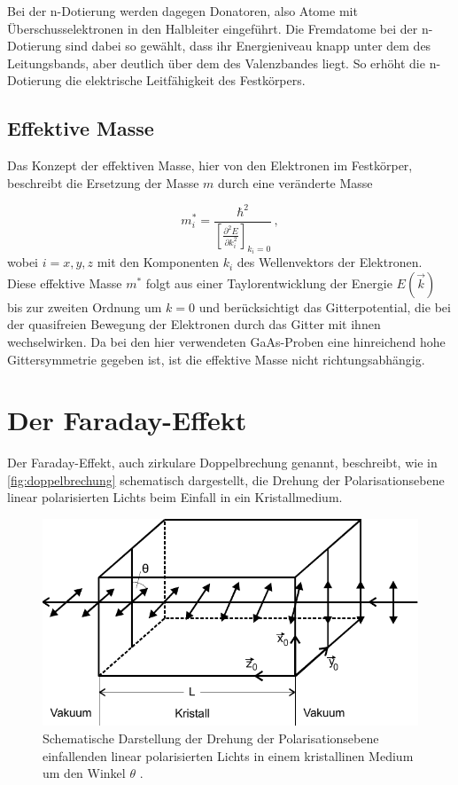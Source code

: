 Bei der n-Dotierung werden dagegen Donatoren, also Atome mit Überschusselektronen in den Halbleiter eingeführt.
Die Fremdatome bei der  n-Dotierung sind dabei so gewählt, dass ihr Energieniveau knapp unter dem des Leitungsbands,
aber deutlich über dem des Valenzbandes liegt.
So erhöht die n-Dotierung die elektrische Leitfähigkeit des Festkörpers.


\subsection{Effektive Masse}

Das Konzept der effektiven Masse, hier von den Elektronen im Festkörper, beschreibt die Ersetzung der Masse $m$ durch eine veränderte Masse

\begin{equation}
    m^*_i = \frac{\hbar^2}{\left[\frac{\partial^2 E}{\partial k^2_i} \right]_{k_i=0}} \,,
    \label{eq:effektivemasse}
\end{equation}
wobei $i = x,y,z$ mit den Komponenten $k_i$ des Wellenvektors der Elektronen.
Diese effektive Masse $m^*$ folgt aus einer Taylorentwicklung der Energie $E(\vec{k})$ bis zur zweiten Ordnung um $k=0$ und berücksichtigt das Gitterpotential,
die bei der quasifreien Bewegung der Elektronen durch das Gitter mit ihnen wechselwirken.
Da bei den hier verwendeten GaAs-Proben eine hinreichend hohe Gittersymmetrie gegeben ist, ist die effektive Masse nicht richtungsabhängig.


\section{Der Faraday-Effekt}

Der Faraday-Effekt, auch zirkulare Doppelbrechung genannt, beschreibt, wie in \autoref{fig:doppelbrechung} schematisch dargestellt,
die Drehung der Polarisationsebene linear polarisierten Lichts beim Einfall in ein Kristallmedium.

\begin{figure}[H]
    \centering
    \includegraphics[width=.6\textwidth]{figures/doppelbrechung.pdf}
    \caption{Schematische Darstellung der Drehung der Polarisationsebene einfallenden linear polarisierten Lichts in einem kristallinen Medium um den Winkel $\theta$ \cite{doppbre}.}
    \label{fig:doppelbrechung}
\end{figure}

